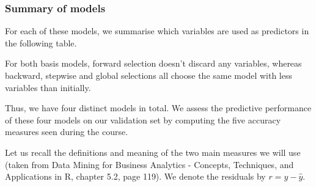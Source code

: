 \documentclass[
  paper=a4,
  ,captions=tableheading
]{scrartcl}
\begin{document}
\hypertarget{summary-of-models}{%
\subsubsection{Summary of models}\label{summary-of-models}}

For each of these models, we summarise which variables are used as
predictors in the following table.

\begin{table}[!h]

\caption{\label{tab:Variable Selection Summary}Predictors used in each linear model}
\centering
{}
\end{table}

For both basis models, forward selection doesn't discard any variables,
whereas backward, stepwise and global selections all choose the same
model with less variables than initially.

Thus, we have four distinct models in total. We assess the predictive
performance of these four models on our validation set by computing the
five accuracy measures seen during the course.

Let us recall the definitions and meaning of the two main measures we
will use (taken from Data Mining for Business Analytics - Concepts,
Techniques, and Applications in R, chapter 5.2, page 119). We denote the
residuals by \(r = y - \hat y\).
\end{document}
